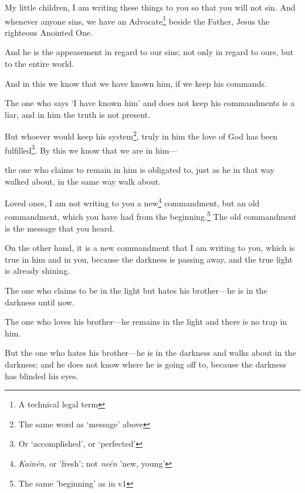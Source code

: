 \documentclass[article]{memoir}%
\newcounter{vnum}
\renewcommand*{\chapter}{
	\vspace{\baselineskip}
	\settowidth{\chapindent}{\chapnumfont 999}
	\noindent\llap{\makebox[\chapindent][l]{%
		\chapnumfont \thechapter}}%
	\addtocounter{chapter}{1}
	\setcounter{vnum}{1}
}
\newcommand{\vnum}{%
	\textsuperscript{\thevnum}%
	\addtocounter{vnum}{1}%
}
\newcommand{\focus}[1]{{#1}}
\newcommand{\lx}[1]{\textit{#1}}
\begin{document}
\chapter {} \vnum My little children, I am writing these things to you so that you will not sin. And whenever anyone sins, we have an Advocate\footnote{A technical legal term} beside the Father, Jesus the righteous Anointed One. \vnum And he is the appeasement in regard to our sins; not only in regard to ours, but to the entire world. \vnum And in this we know that we have known him, if we keep his commands. \vnum The one who says `I have known him' and does not keep his commandments is a liar, and in him the truth is not present. \vnum But whoever would keep his system\footnote{The same word as `message' above}, truly in him the love of God	 has been fulfilled\footnote{Or `accomplished', or `perfected'}. By this we know that we \focus{are} in him---\vnum{}the one who claims to remain in him is obligated to, just as he in that way walked about, in the same way walk about.

\vnum Loved ones, I am not writing to you a new\footnote{\lx{Kainén}, or 'fresh'; not \textit{neén} 'new, young'} commandment, but an old commandment, which you have had from the beginning.\footnote{The same 'beginning' as in v1} The old commandment is the message that you heard. \vnum On the other hand, it is a new commandment that I am writing to you, which is true in him and in you, because the darkness is passing away, and the true light is already shining. \vnum The one who claims to be in the light but hates his brother---he is in the darkness until now. \vnum The one who loves his brother---he remains in the light and there is no trap in him. \vnum But the one who hates his brother---he is in the darkness and walks about in the darkness; and he does not know where he is going off to, because the darkness has blinded his eyes.
\end{document}
